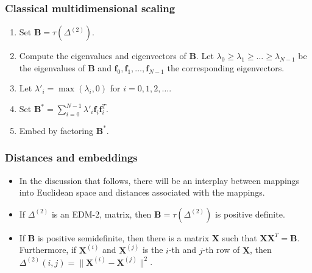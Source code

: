 \documentclass[professionalfonts,hyperref={colorlinks=true,linkcolor=red}]{beamer}
\begin{document}
\begin{frame}
  \frametitle{Classical multidimensional scaling}
  \begin{enumerate}
  \item<2-> Set $\bm{B} =  \tau(\Delta^{(2)})$.  
  \item<3-> Compute the eigenvalues and eigenvectors of $\bm{B}$. Let
    $\lambda_0 \geq \lambda_1 \geq \dots \geq \lambda_{N-1}$ be the
    eigenvalues of $\bm{B}$ and $\bm{f}_0, \bm{f}_1, \dots,
    \bm{f}_{N-1}$ the corresponding eigenvectors. 
  \item<4-> Let $\lambda'_i = \max(\lambda_i, 0)$ for $i =
    0,1,2,\dots$.
  \item<5-> Set $\bm{B}^{*} = \sum_{i=0}^{N-1}{\lambda'_i
      \bm{f}_i \bm{f}_i^{T}}$.   
  \item<6-> Embed by factoring $\bm{B}^{*}$. 
\end{enumerate}
\end{frame}
\begin{frame}
  \frametitle{Distances and embeddings}
  \begin{itemize}[<+->]
  \item In the discussion that follows, there will be an interplay
    between mappings into Euclidean space and distances associated
    with the mappings.
  \item<2-> If $\Delta^{(2)}$ is an EDM-2, matrix, then $\bm{B}
    = \tau(\Delta^{(2)})$ is positive definite.  
  \item<3-> If $\bm{B}$ is positive semidefinite, then there is a
    matrix $\bm{X}$ such that $\bm{X} \bm{X}^{T} =
    \bm{B}$. Furthermore, if $\bm{X}^{(i)}$ and $\bm{X}^{(j)}$ is the
    $i$-th and $j$-th row of $\bm{X}$, then $\Delta^{(2)}(i,j) = \|
    \bm{X}^{(i)} - \bm{X}^{(j)} \|^2$.
  \end{itemize}
\end{frame}
\end{document}
